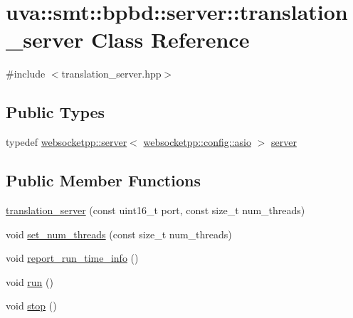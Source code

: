 \hypertarget{classuva_1_1smt_1_1bpbd_1_1server_1_1translation__server}{}\section{uva\+:\+:smt\+:\+:bpbd\+:\+:server\+:\+:translation\+\_\+server Class Reference}
\label{classuva_1_1smt_1_1bpbd_1_1server_1_1translation__server}


{\ttfamily \#include $<$translation\+\_\+server.\+hpp$>$}

\subsection*{Public Types}
\begin{DoxyCompactItemize}
\item 
typedef \hyperlink{classwebsocketpp_1_1server}{websocketpp\+::server}$<$ \hyperlink{structwebsocketpp_1_1config_1_1asio}{websocketpp\+::config\+::asio} $>$ \hyperlink{classuva_1_1smt_1_1bpbd_1_1server_1_1translation__server_a7a3d55d39330bc8414d5c0964c8e5bd7}{server}
\end{DoxyCompactItemize}
\subsection*{Public Member Functions}
\begin{DoxyCompactItemize}
\item 
\hyperlink{classuva_1_1smt_1_1bpbd_1_1server_1_1translation__server_a3f8206303fa38e30dbd84fa8801e2e2e}{translation\+\_\+server} (const uint16\+\_\+t port, const size\+\_\+t num\+\_\+threads)
\item 
void \hyperlink{classuva_1_1smt_1_1bpbd_1_1server_1_1translation__server_a777df696ef2e9bb24fe19b4bff7b7e81}{set\+\_\+num\+\_\+threads} (const size\+\_\+t num\+\_\+threads)
\item 
void \hyperlink{classuva_1_1smt_1_1bpbd_1_1server_1_1translation__server_a0c987a4eb353484a89f6b54c44e4940b}{report\+\_\+run\+\_\+time\+\_\+info} ()
\item 
void \hyperlink{classuva_1_1smt_1_1bpbd_1_1server_1_1translation__server_a16dcf58e027baa12eec503b2323a8131}{run} ()
\item 
void \hyperlink{classuva_1_1smt_1_1bpbd_1_1server_1_1translation__server_a49a359715e8314937625e44c85d79c25}{stop} ()
\end{DoxyCompactItemize}
